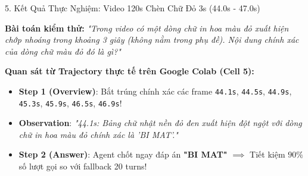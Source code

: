 \documentclass[aspectratio=169, 10pt]{beamer}
\begin{document}
\begin{frame}{5. Kết Quả Thực Nghiệm: Video 120s Chèn Chữ Đỏ 3s (44.0s - 47.0s)}
    \begin{alertblock}{\textbf{Bài toán kiểm thử:}}
        \textit{"Trong video có một dòng chữ in hoa màu đỏ xuất hiện chớp nhoáng trong khoảng 3 giây (không nằm trong phụ đề). Nội dung chính xác của dòng chữ màu đỏ đó là gì?"}
    \end{alertblock}

    \vspace{0.1cm}
    \begin{table}[h]
        \centering
    \end{table}

    \vspace{-0.1cm}
    \begin{exampleblock}{\textbf{Quan sát từ Trajectory thực tế trên Google Colab (Cell 5):}}
        \begin{itemize}\footnotesize
            \item \textbf{Step 1 (Overview)}: Bắt trúng chính xác các frame \texttt{44.1s}, \texttt{44.5s}, \texttt{44.9s}, \texttt{45.3s}, \texttt{45.9s}, \texttt{46.5s}, \texttt{46.9s}!
            \item \textbf{Observation}: \textit{"44.1s: Bảng chữ nhật nền đỏ đen xuất hiện đột ngột với dòng chữ in hoa màu đỏ chính xác là 'BI MAT'."}
            \item \textbf{Step 2 (Answer)}: Agent chốt ngay đáp án \textbf{"BI MAT"} $\implies$ Tiết kiệm \textbf{$90\%$} số lượt gọi so với fallback 20 turns!
        \end{itemize}
    \end{exampleblock}
\end{frame}
\end{document}
